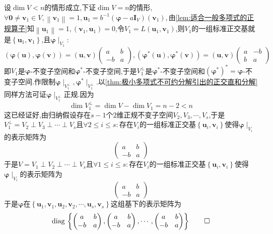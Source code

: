 \begin{formal}
\begin{Proof}
        设$\dim V<n$的情形成立,下证$\dim V=n$的情形,$\forall\bm{0}\neq\bm{v}_1\in V,\left\lVert\bm{v}_1\right\rVert=1,\bm{u}_1=b^{-1}\left(\bm{\varphi}-a\bm{I}_V\right)\left(\bm{v}_1\right),$由\cref{lem:适合一般多项式的正规算子}知$\left\lVert\bm{u}_1\right\rVert=1,\left(
            \bm{v}_1,\bm{u}_1
            \right)=0$,令$V_1=L\left(\bm{u}_1,\bm{v}_1\right)$,则$V_1$的一组标准正交基就是$\left\{\bm{u}_1,\bm{v}_1\right\}$,且$\bm{\varphi}\mid_{V_1}:$\[
        \left(
                \bm{\varphi}\left(\bm{u}\right),\bm{\varphi}\left(\bm{v}\right)
            \right)=\left(\bm{u},\bm{v}\right)\begin{pmatrix}
                a&b\\
                -b&a
            \end{pmatrix},\left(
                \bm{\varphi}^*\left(\bm{u}\right),\bm{\varphi}^*\left(\bm{v}\right)
            \right)=\left(\bm{u},\bm{v}\right)\begin{pmatrix}
                a&-b\\
                b&a
            \end{pmatrix}
        \]即$V_1$是$\bm{\varphi}$-不变子空间和$\bm{\varphi}^*$-不变子空间,于是$V_1^{\perp}$是$\bm{\varphi}^*$-不变子空间和$\left(\bm{\varphi}^*\right)^*= \bm{\varphi}$-不变子空间.作限制$\bm{\varphi}\mid_{V_1^{\perp}},\bm{\varphi}^*\mid_{V_1^{\perp}}$.以\cref{thm:极小多项式不可约分解引出的正交直和分解}同样方法可证$\bm{\varphi}\mid_{V_1^{\perp}}$正规.因为\[
        \dim V_1^{\perp}=\dim V-\dim V_1=n-2<n
        \]这已经证好,由归纳假设存在$s-1$个$2$维正规不变子空间$V_2,V_3,\cdots,V_s$,于是$V_1^{\perp}=V_2\perp V_3\perp\cdots\perp V_s$且$\forall2\leqslant i\leqslant s:$存在$V_i$的一组标准正交基$\left\{\bm{u}_i,\bm{v}_i\right\}$使得$\bm{\varphi}\mid_{V_i}$的表示矩阵为\[
        \begin{pmatrix}
            a&b\\
            -b&a
        \end{pmatrix}
        \]于是$V=V_1\perp V_2\perp\cdots\perp V_s$且$\forall1\leqslant i\leqslant s:$存在$V_i$的一组标准正交基$\left\{\bm{u}_i,\bm{v}_i\right\}$使得$\bm{\varphi}\mid_{V_i}$的表示矩阵为\[
        \begin{pmatrix}
            a&b\\
            -b&a
        \end{pmatrix}
        \]于是$\bm{\varphi}$在$\left\{
            \bm{u}_1,\bm{v}_1,\bm{u}_2,\bm{v}_2,\cdots,\bm{u}_s,\bm{v}_s
        \right\}$这组基下的表示矩阵为\[
        \mathrm{diag}\,\left\{
            \begin{pmatrix}
                a&b\\
                -b&a
            \end{pmatrix},\begin{pmatrix}
                a&b\\
                -b&a
            \end{pmatrix},\cdots,\begin{pmatrix}
                a&b\\
                -b&a
            \end{pmatrix}
        \right\}\qedhere
        \]
    \end{Proof}
\end{formal}
